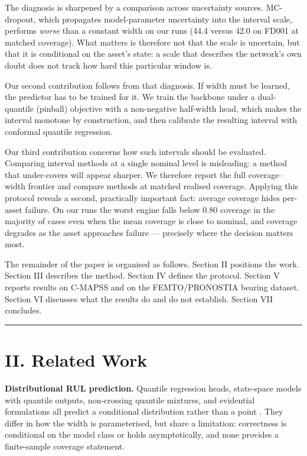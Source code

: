 ﻿\documentclass[journal]{IEEEtran}
\begin{document}
The diagnosis is sharpened by a comparison across uncertainty sources. MC-dropout, which propagates model-parameter uncertainty into the interval scale, performs \emph{worse} than a constant width on our runs (44.4 versus 42.0 on FD001 at matched coverage). What matters is therefore not that the scale is uncertain, but that it is conditional on the asset's state: a scale that describes the network's own doubt does not track how hard this particular window is.

Our second contribution follows from that diagnosis. If width must be learned, the predictor has to be trained for it. We train the backbone under a dual-quantile (pinball) objective with a non-negative half-width head, which makes the interval monotone by construction, and then calibrate the resulting interval with conformal quantile regression.

Our third contribution concerns how such intervals should be evaluated. Comparing interval methods at a single nominal level is misleading: a method that under-covers will appear sharper. We therefore report the full coverage--width frontier and compare methods at matched realised coverage. Applying this protocol reveals a second, practically important fact: average coverage hides per-asset failure. On our runs the worst engine falls below 0.80 coverage in the majority of cases even when the mean coverage is close to nominal, and coverage degrades as the asset approaches failure --- precisely where the decision matters most.

The remainder of the paper is organised as follows. Section II positions the work. Section III describes the method. Section IV defines the protocol. Section V reports results on C-MAPSS and on the FEMTO/PRONOSTIA bearing dataset. Section VI discusses what the results do and do not establish. Section VII concludes.

\begin{center}\rule{0.5\linewidth}{0.5pt}\end{center}

\section{II. Related Work}\label{ii.-related-work}

\textbf{Distributional RUL prediction.} Quantile regression heads, state-space models with quantile outputs, non-crossing quantile mixtures, and evidential formulations all predict a conditional distribution rather than a point \citep{frizzo2025, frizzo2026, ly2025, hou2025, srinivasan2026}. They differ in how the width is parameterised, but share a limitation: correctness is conditional on the model class or holds asymptotically, and none provides a finite-sample coverage statement.
\end{document}
